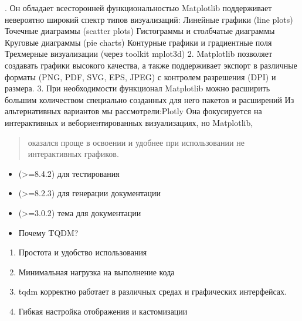 \documentclass[a4paper,11pt,russian,openany,oneside]{sphinxmanual}
\begin{document}
. Он обладает всесторонней функциональностью
Matplotlib поддерживает невероятно широкий спектр типов визуализаций:
Линейные графики (line plots)
Точечные диаграммы (scatter plots)
Гистограммы и столбчатые диаграммы
Круговые диаграммы (pie charts)
Контурные графики и градиентные поля
Трехмерные визуализации (через toolkit mplot3d)
2. Matplotlib позволяет создавать графики высокого качества,
а также поддерживает экспорт в различные форматы (PNG, PDF, SVG, EPS, JPEG) с контролем разрешения (DPI) и размера.
3. При необходимости функционал Matplotlib можно расширить большим количеством специально созданных для него пакетов и расширений
Из альтернативных вариантов мы рассмотрели:Plotly
\sphinxhyphen{}Она фокусируется на интерактивных и веб\sphinxhyphen{}ориентированных визуализациях, но Matplotlib,
\begin{quote}

\sphinxAtStartPar
оказался проще в освоении и удобнее при использовании не интерактивных графиков.
\end{quote}
\begin{itemize}
\item {} 
\sphinxAtStartPar
{} (>=8.4.2) \sphinxhyphen{} для тестирования

\item {} 
\sphinxAtStartPar
{} (>=8.2.3) \sphinxhyphen{} для генерации документации

\item {} 
\sphinxAtStartPar
{} (>=3.0.2) \sphinxhyphen{} тема для документации

\item {} \begin{description}
\sphinxAtStartPar
Почему TQDM?

\end{description}

\end{itemize}
\begin{enumerate}
%
\item {} 
\sphinxAtStartPar
Простота и удобство использования

\item {} 
\sphinxAtStartPar
Минимальная нагрузка на выполнение кода

\item {} 
\sphinxAtStartPar
tqdm корректно работает в различных средах и графических интерфейсах.

\item {} 
\sphinxAtStartPar
Гибкая настройка отображения и кастомизации

\end{enumerate}
\end{document}
